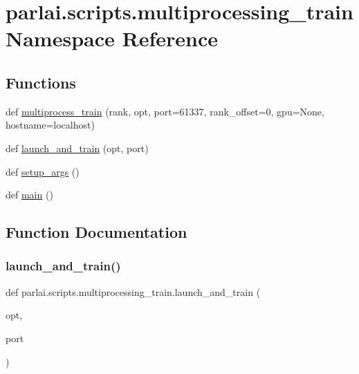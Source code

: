 \hypertarget{namespaceparlai_1_1scripts_1_1multiprocessing__train}{}\section{parlai.\+scripts.\+multiprocessing\+\_\+train Namespace Reference}
\label{namespaceparlai_1_1scripts_1_1multiprocessing__train}
\subsection*{Functions}
\begin{DoxyCompactItemize}
\item 
def \hyperlink{namespaceparlai_1_1scripts_1_1multiprocessing__train_aa979267c9eb44bbdfcd25a6d69a58cc4}{multiprocess\+\_\+train} (rank, opt, port=61337, rank\+\_\+offset=0, gpu=None, hostname=\textquotesingle{}localhost\textquotesingle{})
\item 
def \hyperlink{namespaceparlai_1_1scripts_1_1multiprocessing__train_a5dc8df166f1c025b54f7420a1ab2f812}{launch\+\_\+and\+\_\+train} (opt, port)
\item 
def \hyperlink{namespaceparlai_1_1scripts_1_1multiprocessing__train_a1ee26bddeb470040cfbceb5ee7a9fa08}{setup\+\_\+args} ()
\item 
def \hyperlink{namespaceparlai_1_1scripts_1_1multiprocessing__train_aa7b2a133561ac5212f3ee9814a645522}{main} ()
\end{DoxyCompactItemize}


\subsection{Function Documentation}
\mbox{\label{namespaceparlai_1_1scripts_1_1multiprocessing__train_a5dc8df166f1c025b54f7420a1ab2f812}} 
\subsubsection{\texorpdfstring{launch\+\_\+and\+\_\+train()}{launch\_and\_train()}}
{\footnotesize\ttfamily def parlai.\+scripts.\+multiprocessing\+\_\+train.\+launch\+\_\+and\+\_\+train (\begin{DoxyParamCaption}\item[{}]{opt,  }\item[{}]{port }\end{DoxyParamCaption})}

